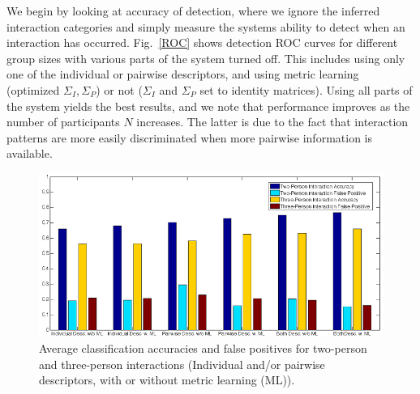 We begin by looking at accuracy of detection, where we ignore the inferred interaction categories and simply measure the systems ability to detect when an interaction has occurred. Fig.~\ref{ROC} shows detection ROC curves for different group sizes with various parts of the system turned off. This includes using only one of the individual or pairwise descriptors, and using metric learning (optimized $\Sigma_I,\Sigma_P$) or not ($\Sigma_I$ and $\Sigma_P$ set to identity matrices). Using all parts of the system yields the best results, and we note that performance improves as the number of participants $N$ increases. The latter is due to the fact that interaction patterns are more easily discriminated when more pairwise information is available.



\begin{figure}[t]
\vspace{-5pt}
\begin{center}
\includegraphics[width=\columnwidth]{class_bar.png}
\end{center}
\caption{Average classification accuracies and false positives for two-person and three-person interactions (Individual and/or pairwise descriptors, with or without metric learning (ML)).}
\label{classtemporal}
\vspace{-5pt}
\end{figure}

